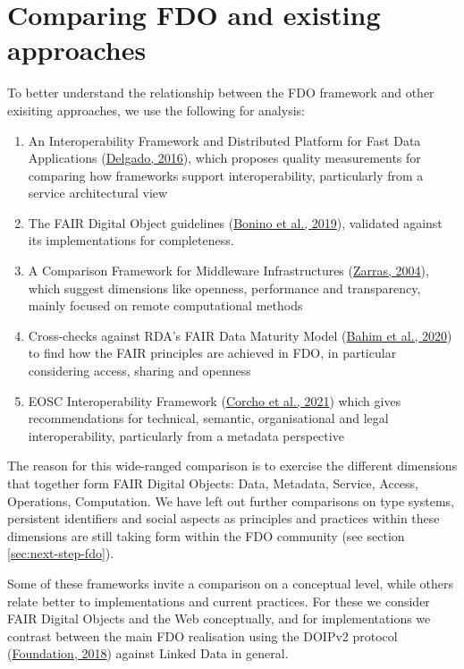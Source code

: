 \hypertarget{sec:comparing}{%
\section{Comparing FDO and existing approaches}\label{sec:comparing}}

To better understand the relationship between the FDO framework and other exisiting approaches, we use the following for analysis:

\begin{enumerate}
\def\labelenumi{\arabic{enumi}.}
\tightlist
\item
  An Interoperability Framework and Distributed Platform for Fast Data Applications (\protect\hyperlink{ref-KlCFFFyL}{Delgado, 2016}), which proposes quality measurements for comparing how frameworks support interoperability, particularly from a service architectural view
\item
  The FAIR Digital Object guidelines (\protect\hyperlink{ref-RwvirqWg}{Bonino et al., 2019}), validated against its implementations for completeness.
\item
  A Comparison Framework for Middleware Infrastructures (\protect\hyperlink{ref-hRzcHhPD}{Zarras, 2004}), which suggest dimensions like openness, performance and transparency, mainly focused on remote computational methods
\item
  Cross-checks against RDA's FAIR Data Maturity Model (\protect\hyperlink{ref-UzQhqk0M}{Bahim et al., 2020}) to find how the FAIR principles are achieved in FDO, in particular considering access, sharing and openness
\item
  EOSC Interoperability Framework (\protect\hyperlink{ref-aCye3KpE}{Corcho et al., 2021}) which gives recommendations for technical, semantic, organisational and legal interoperability, particularly from a metadata perspective
\end{enumerate}

The reason for this wide-ranged comparison is to exercise the different dimensions that together form FAIR Digital Objects: Data, Metadata, Service, Access, Operations, Computation.
We have left out further comparisons on type systems, persistent identifiers and social aspects as principles and practices within these dimensions are still taking form within the FDO community (see section \ref{sec:next-step-fdo}).

Some of these frameworks invite a comparison on a conceptual level, while others relate better to implementations and current practices. For these we consider FAIR Digital Objects and the Web conceptually, and for implementations we contrast between the main FDO realisation using the DOIPv2 protocol (\protect\hyperlink{ref-13TcbsZF6}{Foundation, 2018}) against Linked Data in general.

